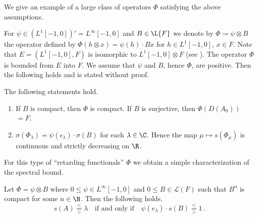 \begin{example}\label{ex:c4-3.9}
%
We give an example of a large class of operators $\Phi$ satisfying the above assumptions.

For $\psi \in (L^{1}[-1,0])' = L^{\infty}[-1,0]$ and $B \in \L{F}$ we denote by $\Phi \coloneqq \psi \otimes B$ the operator defined by $\Phi(h \otimes x) = \psi(h) \cdot Bx$ for $h \in L^{1}[-1,0]$, $x \in F$.
Note that $E = (L^{1}[-1,0],F)$ is isomorphic to $L^{1}[-1,0] \otimes F$ (see \textcite[Chapter III,6.5]{schaefer:1966}).
The operator $\Phi$ is bounded from $E$ into $F$.
We assume that $\psi$ and $B$, hence $\Phi$, are positive.
Then the following holds and is stated without proof.
\begin{lemma*}\label{lem:c4-3.9-kgk}
%
The following statements hold.
\begin{enumerate}[\upshape (i), wide,labelindent=.25em] 
\item \label{lem:c4-3.9-kgk.1}
If\/ $B$ is compact, then $\Phi$ is compact. 
If\/ $B$ is surjective, then $\Phi(D(A_{0}))$ $= F$.

\item \label{lem:c4-3.9-kgk.2}
$\sigma(\Phi_{\lambda}) = \psi(\epsilon_{\lambda}) \cdot \sigma(B)$ for each $\lambda \in \C$. 
Hence the map $\mu \mapsto s(\Phi_{\mu})$ is continuous and strictly decreasing on $\R$.
\end{enumerate}
\end{lemma*}
\end{example}
For this type of \enquote{retarding functionals} $\Phi$ we obtain a simple characterization of the spectral bound.
\begin{corollary*}\label{cor:c4-3.9-kgk}
Let $\Phi = \psi \otimes B$ where $0 \leq \psi \in L^{\infty}[-1,0]$ and $0 \leq B \in \mathcal{L}(F)$ such that $B^{n}$ is compact for some $n \in \N$.
Then the following holds.
\begin{equation}\label{eq:c4-3.10}
s(A) \overset{<}{ \underset{>}{=} } \lambda \quad 
\text{if and only if} 
\quad 
\psi(e_{\lambda}) \cdot s(B) 
\overset{<}{ \underset{>}{=} } 1 \,.
\end{equation}
\end{corollary*}
